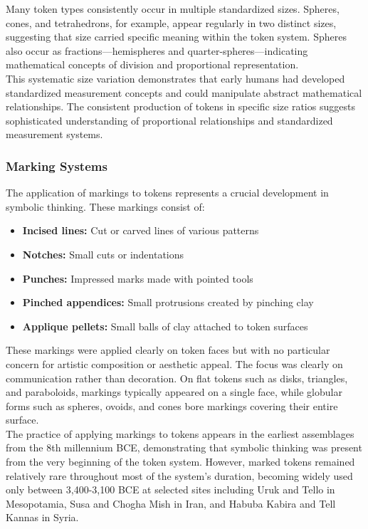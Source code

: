 \documentclass[12pt, oneside, openany]{book}
\begin{document}
Many token types consistently occur in multiple standardized sizes. Spheres, cones, and tetrahedrons, for example, appear regularly in two distinct sizes, suggesting that size carried specific meaning within the token system. Spheres also occur as fractions—hemispheres and quarter-spheres—indicating mathematical concepts of division and proportional representation.\\
This systematic size variation demonstrates that early humans had developed standardized measurement concepts and could manipulate abstract mathematical relationships. The consistent production of tokens in specific size ratios suggests sophisticated understanding of proportional relationships and standardized measurement systems.

\subsubsection{Marking Systems}

The application of markings to tokens represents a crucial development in symbolic thinking. These markings consist of:

\begin{itemize}
	\item \textbf{Incised lines:} Cut or carved lines of various patterns
	\item \textbf{Notches:} Small cuts or indentations
	\item \textbf{Punches:} Impressed marks made with pointed tools
	\item \textbf{Pinched appendices:} Small protrusions created by pinching clay
	\item \textbf{Applique pellets:} Small balls of clay attached to token surfaces
\end{itemize}

These markings were applied clearly on token faces but with no particular concern for artistic composition or aesthetic appeal. The focus was clearly on communication rather than decoration. On flat tokens such as disks, triangles, and paraboloids, markings typically appeared on a single face, while globular forms such as spheres, ovoids, and cones bore markings covering their entire surface.\\
The practice of applying markings to tokens appears in the earliest assemblages from the 8th millennium BCE, demonstrating that symbolic thinking was present from the very beginning of the token system. However, marked tokens remained relatively rare throughout most of the system's duration, becoming widely used only between 3,400-3,100 BCE at selected sites including Uruk and Tello in Mesopotamia, Susa and Chogha Mish in Iran, and Habuba Kabira and Tell Kannas in Syria.
\end{document}
